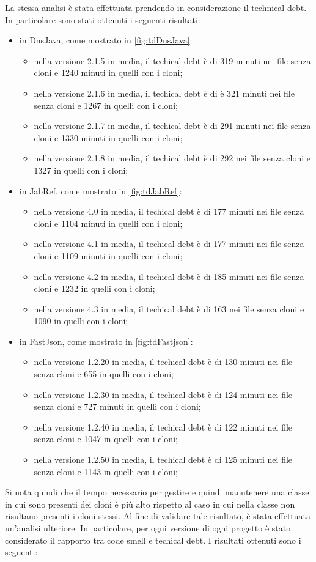 La stessa analisi è stata effettuata prendendo in considerazione il technical debt. In particolare sono stati ottenuti i seguenti risultati:
\begin{itemize}
		\item in DnsJava, come mostrato in \autoref{fig:tdDnsJava}:
	\begin{itemize}
		\item nella versione 2.1.5 in media, il techical debt è di 319 minuti nei file senza cloni e 1240 minuti in quelli con i cloni;
		\item nella versione 2.1.6 in media, il techical debt è di è 321 minuti nei file senza cloni e 1267 in quelli con i cloni;
		\item nella versione 2.1.7 in media, il techical debt è di 291 minuti nei file senza cloni e 1330 minuti in quelli con i cloni;
		\item nella versione 2.1.8 in media, il techical debt è di 292 nei file senza cloni e 1327 in quelli con i cloni;
	\end{itemize}
	\item in JabRef, come mostrato in \autoref{fig:tdJabRef}:
	\begin{itemize}
		\item nella versione 4.0 in media, il techical debt è di 177 minuti nei file senza cloni e 1104 minuti in quelli con i cloni;
		\item nella versione 4.1 in media, il techical debt è di 177 minuti nei file senza cloni e 1109 minuti in quelli con i cloni;
		\item nella versione 4.2 in media, il techical debt è di 185 minuti nei file senza cloni e 1232 in quelli con i cloni;
		\item nella versione 4.3 in media, il techical debt è di 163 nei file senza cloni e 1090 in quelli con i cloni;
	\end{itemize} 
		\item in FastJson, come mostrato in \autoref{fig:tdFastjson}:
	\begin{itemize}
		\item nella versione 1.2.20 in media, il techical debt è di 130 minuti nei file senza cloni e 655 in quelli con i cloni;
		\item nella versione 1.2.30 in media, il techical debt è di 124 minuti nei file senza cloni e 727 minuti in quelli con i cloni;
		\item nella versione 1.2.40 in media, il techical debt è di 122 minuti nei file senza cloni e 1047 in quelli con i cloni;
		\item nella versione 1.2.50 in media, il techical debt è di 125 minuti nei file senza cloni e 1143 in quelli con i cloni;
	\end{itemize}
\end{itemize}
Si nota quindi che il tempo necessario per gestire e quindi manutenere una classe in cui sono presenti dei cloni è più alto rispetto al caso in cui nella classe non risultano presenti i cloni stessi. Al fine di validare tale risultato, è stata effettuata un'analisi ulteriore. In particolare, per ogni versione di ogni progetto è stato considerato il rapporto tra code smell e techical debt. I risultati ottenuti sono i seguenti:

